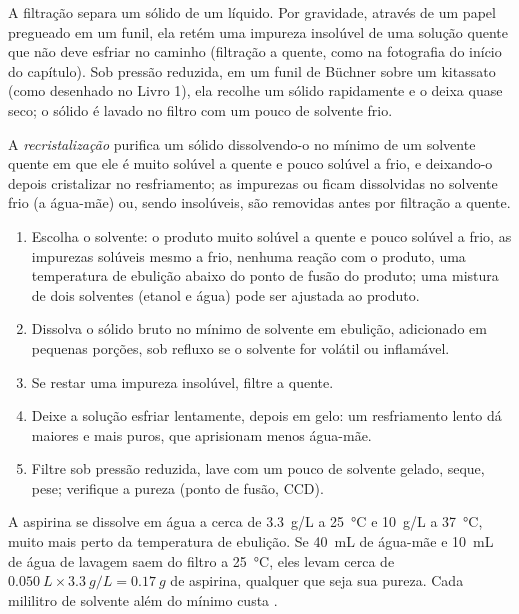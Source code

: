 A filtração separa um sólido de um líquido. Por gravidade, através de um
papel pregueado em um funil, ela retém uma impureza insolúvel de uma
solução quente que não deve esfriar no caminho (filtração a quente, como
na fotografia do início do capítulo). Sob pressão reduzida, em um funil de
Büchner sobre um kitassato (como desenhado no Livro 1), ela recolhe um
sólido rapidamente e o deixa quase seco; o sólido é lavado no filtro com
um pouco de solvente frio.

\begin{definition}[Recristalização]\label{def:b1:lab-techniques-1:recrystallisation}
A \emph{recristalização} purifica um sólido
dissolvendo-o no mínimo de um solvente quente em que ele é muito solúvel
a quente e pouco solúvel a frio, e deixando-o depois cristalizar no
resfriamento; as impurezas ou ficam dissolvidas no solvente frio (a
água-mãe) ou, sendo insolúveis, são removidas antes por filtração a quente.
\end{definition}

\begin{method}\label{met:b1:lab-techniques-1:recrystallise}
\begin{enumerate}
  \item Escolha o solvente: o produto muito solúvel a quente e pouco
        solúvel a frio, as impurezas solúveis mesmo a frio, nenhuma
        reação com o produto, uma temperatura de ebulição abaixo do ponto
        de fusão do produto; uma mistura de dois solventes 
        (etanol e água) pode ser ajustada ao produto.
  \item Dissolva o sólido bruto no mínimo de solvente em ebulição,
        adicionado em pequenas porções, sob refluxo se o solvente for
        volátil ou inflamável.
  \item Se restar uma impureza insolúvel, filtre a quente.
  \item Deixe a solução esfriar lentamente, depois em gelo: um
        resfriamento lento dá  maiores e mais puros, que aprisionam
        menos água-mãe.
  \item Filtre sob pressão reduzida, lave com um pouco de solvente
        gelado, seque, pese; verifique a pureza (ponto de fusão, CCD).
\end{enumerate}
\end{method}

\begin{example}
A aspirina se dissolve em água a cerca de \qty{3.3}{g/L} a \qty{25}{\celsius}
e \qty{10}{g/L} a \qty{37}{\celsius}, muito mais perto da temperatura de
ebulição. Se \qty{40}{mL} de água-mãe e \qty{10}{mL} de água de lavagem
saem do filtro a \qty{25}{\celsius}, eles levam cerca de
$\qty{0.050}{L} \times \qty{3.3}{g/L} = \qty{0.17}{g}$ de aspirina, qualquer
que seja sua pureza. Cada mililitro de solvente além do mínimo custa
.
\end{example}


